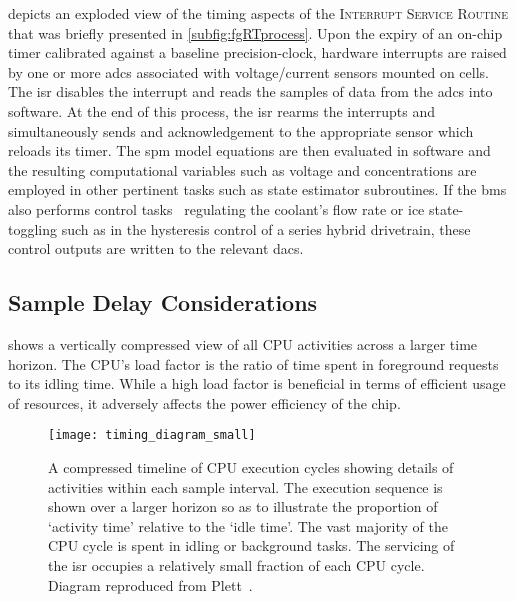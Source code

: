   depicts  an exploded  view  of  the timing  aspects
of  the  \textsc{Interrupt  Service  Routine}  that  was  briefly  presented  in
\cref{subfig:fgRTprocess}.  Upon  the  expiry  of an  on-chip  timer  calibrated
against a  baseline precision-clock,  hardware interrupts are  raised by  one or
more \glspl{adc} associated  with voltage/current sensors mounted  on cells. The
\gls{isr}  disables  the interrupt  and  reads  the  samples  of data  from  the
\glspl{adc} into software. At the end  of this process, the \gls{isr} rearms the
interrupts  and  simultaneously sends  and  acknowledgement  to the  appropriate
sensor which reloads its timer. The \gls{spm} model equations are then evaluated
in  software and  the  resulting  computational variables  such  as voltage  and
concentrations are  employed in  other pertinent tasks  such as  state estimator
subroutines. If  the \gls{bms}  also performs  control tasks  \eg~regulating the
coolant's  flow rate  or  \gls{ice}  state-toggling such  as  in the  hysteresis
control of a series hybrid drivetrain,  these control outputs are written to the
relevant \glspl{dac}.



\subsection{Sample Delay Considerations}

  shows a  vertically  compressed view  of all  CPU
activities across a larger  time horizon. The CPU's load factor  is the ratio of
time spent in foreground  requests to its idling time. While  a high load factor
is beneficial in terms of efficient usage of resources, it adversely affects the
power efficiency of the chip.

\begin{figure}[!htbp]
    \centering
    \texttt{[image: timing\_diagram\_small]}
    \caption[Timeline of  activities over multiple CPU cycles of a real-time
    controller]{A compressed timeline of CPU execution cycles showing details of
        activities within each sample interval. The execution sequence is shown
        over a larger horizon so as to illustrate the proportion of `activity
        time' relative to the `idle time'. The vast majority of the CPU cycle is
        spent in idling or background tasks. The servicing of the \gls{isr}
        occupies a relatively small fraction of each CPU cycle. Diagram
    reproduced from Plett~\cite{PlettECE5540_02}.}
    \label{fig:timingdiagramSmall}
\end{figure}

